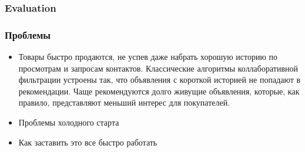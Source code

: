 \documentclass[14pt]{beamer}
\begin{document}
		\begin{frame}
			\frametitle{Evaluation}
			\begin{figure}[h]
				\begin{minipage}[h]{1.1\linewidth}
				\end{minipage}
			\end{figure}
		\end{frame}
				
		\begin{frame}
			\frametitle{Проблемы}
			\begin{itemize}
				\item Товары быстро продаются, не успев даже набрать хорошую историю по просмотрам и запросам контактов. Классические алгоритмы коллаборативной фильтрации устроены так, что объявления с короткой историей не попадают в рекомендации. Чаще рекомендуются долго живущие объявления, которые, как правило, представляют меньший интерес для покупателей.
				\item Проблемы холодного старта
				\item Как заставить это все быстро работать
			\end{itemize}
		\end{frame}
\end{document}
